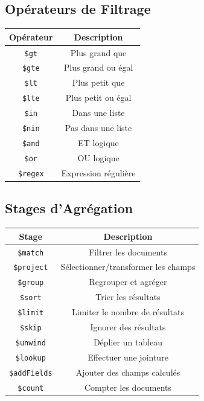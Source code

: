 \documentclass[11pt,a4paper]{article}
\begin{document}
\subsection{Opérateurs de Filtrage}

\begin{table}[h]
\centering
\begin{tabular}{|c|c|}
\hline
\textbf{Opérateur} & \textbf{Description} \\
\hline
\texttt{\$gt} & Plus grand que \\
\hline
\texttt{\$gte} & Plus grand ou égal \\
\hline
\texttt{\$lt} & Plus petit que \\
\hline
\texttt{\$lte} & Plus petit ou égal \\
\hline
\texttt{\$in} & Dans une liste \\
\hline
\texttt{\$nin} & Pas dans une liste \\
\hline
\texttt{\$and} & ET logique \\
\hline
\texttt{\$or} & OU logique \\
\hline
\texttt{\$regex} & Expression régulière \\
\hline
\end{tabular}
\end{table}

\subsection{Stages d'Agrégation}

\begin{table}[h]
\centering
\begin{tabular}{|c|c|}
\hline
\textbf{Stage} & \textbf{Description} \\
\hline
\texttt{\$match} & Filtrer les documents \\
\hline
\texttt{\$project} & Sélectionner/transformer les champs \\
\hline
\texttt{\$group} & Regrouper et agréger \\
\hline
\texttt{\$sort} & Trier les résultats \\
\hline
\texttt{\$limit} & Limiter le nombre de résultats \\
\hline
\texttt{\$skip} & Ignorer des résultats \\
\hline
\texttt{\$unwind} & Déplier un tableau \\
\hline
\texttt{\$lookup} & Effectuer une jointure \\
\hline
\texttt{\$addFields} & Ajouter des champs calculés \\
\hline
\texttt{\$count} & Compter les documents \\
\hline
\end{tabular}
\end{table}
\end{document}
